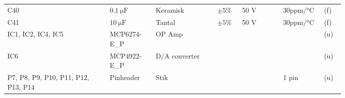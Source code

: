 \begin{table}[h!]
\begin{threeparttable}
\begin{tabular}{p{0.25\linewidth}p{0.1\linewidth}p{0.15\linewidth}p{0.05\linewidth}p{0.1\linewidth}p{0.1\linewidth}p{0.05\linewidth}}
C40 & $\SI{0.1}{\micro\farad}$ & Keramisk & $\pm 5\%$ & 50 \si{\volt} & 30ppm/\si{\celsius} & (f)\\
C41 & $\SI{10}{\micro\farad}$ & Tantal & $\pm 5\%$ & 50 \si{\volt} & 30ppm/\si{\celsius} & (f)\\
\midrule
IC1, IC2, IC4, IC5 & MCP6274-E\_P & OP Amp &  &  &  & (u) \\
IC6 & MCP4922-E\_P & D/A converter &  &  &  & (u) \\
P7, P8, P9, P10, P11, P12, P13, P14 & Pinheader & Stik &  &  & 1 pin & (u) \\

\end{tabular}
\end{threeparttable}
\end{table}
